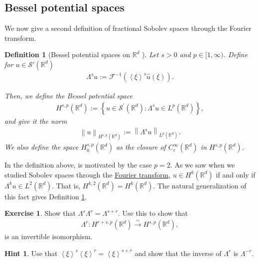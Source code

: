 \documentclass[
    a4paper,
    DIV=14,
    abstract=true,
    numbers=noenddot
]
{scrartcl}
\newtheorem{definition}[theorem]{Definition}
\theoremstyle{definition}
\newtheorem{exercise}{Exercise}
\newtheorem*{hint}{Hint}
\newcommand{\wh}[1]{\widehat{#1}}
\newcommand{\br}[1]{\left\langle#1\right\rangle}
\renewcommand{\norm}[1]{\left\lVert #1 \right\rVert}\renewcommand{\abs}[1]{\left| #1 \right|}
\newcommand{\iso}{\xrightarrow{\sim}}
\newcommand{\R}{\mathbb{R}}
\newcommand{\Ff}{\mathcal{F}}
\newcommand{\Ss}{\mathcal{S}}
\begin{document}
\subsection{Bessel potential spaces}
We now give a second definition of fractional Sobolev spaces through the Fourier transform.
\begin{definition}[Bessel potential spaces on $\R^d$ ]\label{bessel potential def}
  Let $s>0$ and $p \in [1,\infty)$. Define for $u \in \Ss'(\R^d)$
  \begin{align*}
    \Lambda^s u := \Ff^{-1}\left(\br{\xi}^s \wh{u}(\xi)\right).
  \end{align*}

  Then, we define the \emph{Bessel potential space}
  \begin{align*}
    H^{s,p}(\R^d):=\left\{u \in \mathcal{S}^{\prime}(\mathbb{R}^d): \Lambda ^s u \in L^p(\mathbb{R}^d)\right\},
  \end{align*}
  and give it the norm
  \begin{align*}
    \norm{u}_{H^{s,p}(\R^d)}:= \norm{\Lambda^s u}_{L^p(\R^d)}.
  \end{align*}
  We also define the space $H_0^{s,p}(\R^d)$ as the closure of $C_c^\infty(\R^d)$ in $H^{s,p}(\R^d)$.
\end{definition}
In the definition above, is motivated by the case $p=2$. As we saw when we studied Sobolev spaces through the \href{https://nowheredifferentiable.com/2023-01-29-PDE-1-Fourier/#:~:text=Sobolev%20spaces-,Sobolev%20spaces,-form%20a%20particular}{Fourier transform}, $u \in H^k(\R^d)$ if and only if $\Lambda^k u \in L^2(\R^d)$. That is, $H^{k,2}(\R^d)=H^{k}(\R^d)$.
The natural generalization of this fact gives Definition \ref{bessel potential def}.
\begin{exercise}
  Show that $\Lambda^s\Lambda^r=\Lambda^{s+r}$. Use this to show that
  \begin{align*}
    \Lambda^r: H^{r+s,p}(\R^d) \iso  H^{s,p}(\R^d),
  \end{align*}
  is an invertible isomorphism.
\end{exercise}
\begin{hint}
  Use that $\br{\xi}^s\br{\xi}^r=\br{\xi}^{s+r}$ and show that the inverse of $\Lambda^r$ is $\Lambda^{-r}$.
\end{hint}
\end{document}
